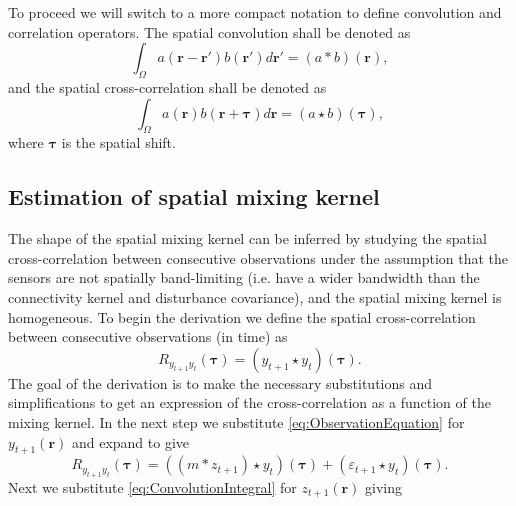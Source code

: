 \documentclass[10pt,twocolumn,twoside]{IEEEtran}
\begin{document}
To proceed we will switch to a more compact notation to define convolution and correlation operators. The spatial convolution shall be denoted as
\begin{equation}
	\int_\Omega a(\mathbf{r}-\mathbf{r}')b(\mathbf{r}')d\mathbf{r}' = (a\ast b)(\mathbf{r}),
\end{equation}
and the spatial cross-correlation shall be denoted as 
\begin{equation}
	\int_\Omega a(\mathbf{r})b(\mathbf{r}+\boldsymbol{\tau})d\mathbf{r} = (a\star b)(\boldsymbol{\tau}),
\end{equation} 
where $\boldsymbol{\tau}$ is the spatial shift.

\subsection{Estimation of spatial mixing kernel} 
The shape of the spatial mixing kernel can be inferred by studying the spatial cross-correlation between consecutive observations under the assumption that the sensors are not spatially band-limiting (i.e. have a wider bandwidth than the connectivity kernel and disturbance covariance), and the spatial mixing kernel is homogeneous.  To begin the derivation we define the spatial cross-correlation between consecutive observations (in time) as  
\begin{equation}
	R_{y_{t+1}y_t}(\boldsymbol{\tau}) = \left(y_{t+1}\star y_t\right)\left(\boldsymbol{\tau}\right).
\end{equation}
The goal of the derivation is to make the necessary substitutions and simplifications to get an expression of the cross-correlation as a function of the mixing kernel. In the next step we substitute \eqref{eq:ObservationEquation} for $y_{t+1}(\mathbf{r})$ and expand to give
\begin{equation}
	R_{y_{t+1}y_t}\left(\boldsymbol{\tau}\right) = \left(\left(m \ast z_{t+1}\right)\star y_t\right)\left(\boldsymbol{\tau}\right) + \left(\varepsilon_{t+1} \star y_t\right)\left(\boldsymbol{\tau}\right).
\end{equation}
Next we substitute \eqref{eq:ConvolutionIntegral} for $z_{t+1}(\mathbf{r})$ giving 
\end{document}
